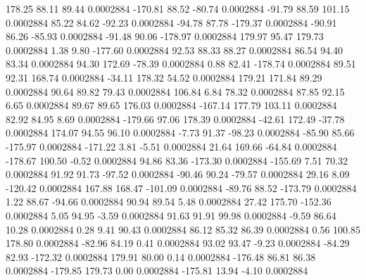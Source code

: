       178.25       88.11       89.44     0.0002884
     -170.81       88.52      -80.74     0.0002884
      -91.79       88.59      101.15     0.0002884
       85.22       84.62      -92.23     0.0002884
      -94.78       87.78     -179.37     0.0002884
      -90.91       86.26      -85.93     0.0002884
      -91.48       90.06     -178.97     0.0002884
      179.97       95.47      179.73     0.0002884
        1.38        9.80     -177.60     0.0002884
       92.53       88.33       88.27     0.0002884
       86.54       94.40       83.34     0.0002884
       94.30      172.69      -78.39     0.0002884
        0.88       82.41     -178.74     0.0002884
       89.51       92.31      168.74     0.0002884
      -34.11      178.32       54.52     0.0002884
      179.21      171.84       89.29     0.0002884
       90.64       89.82       79.43     0.0002884
      106.84        6.84       78.32     0.0002884
       87.85       92.15        6.65     0.0002884
       89.67       89.65      176.03     0.0002884
     -167.14      177.79      103.11     0.0002884
       82.92       84.95        8.69     0.0002884
     -179.66       97.06      178.39     0.0002884
      -42.61      172.49      -37.78     0.0002884
      174.07       94.55       96.10     0.0002884
       -7.73       91.37      -98.23     0.0002884
      -85.90       85.66     -175.97     0.0002884
     -171.22        3.81       -5.51     0.0002884
       21.64      169.66      -64.84     0.0002884
     -178.67      100.50       -0.52     0.0002884
       94.86       83.36     -173.30     0.0002884
     -155.69        7.51       70.32     0.0002884
       91.92       91.73      -97.52     0.0002884
      -90.46       90.24      -79.57     0.0002884
       29.16        8.09     -120.42     0.0002884
      167.88      168.47     -101.09     0.0002884
      -89.76       88.52     -173.79     0.0002884
        1.22       88.67      -94.66     0.0002884
       90.94       89.54        5.48     0.0002884
       27.42      175.70     -152.36     0.0002884
        5.05       94.95       -3.59     0.0002884
       91.63       91.91       99.98     0.0002884
       -9.59       86.64       10.28     0.0002884
        0.28        9.41       90.43     0.0002884
       86.12       85.32       86.39     0.0002884
        0.56      100.85      178.80     0.0002884
      -82.96       84.19        0.41     0.0002884
       93.02       93.47       -9.23     0.0002884
      -84.29       82.93     -172.32     0.0002884
      179.91       80.00        0.14     0.0002884
     -176.48       86.81       86.38     0.0002884
     -179.85      179.73        0.00     0.0002884
     -175.81       13.94       -4.10     0.0002884
